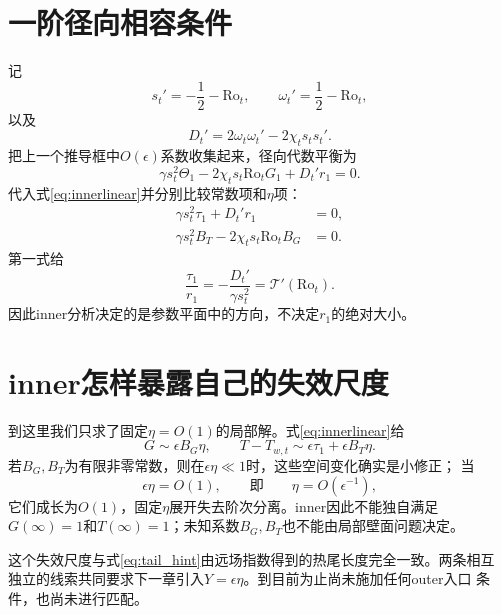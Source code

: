 \documentclass[UTF8,zihao=-4,openany]{ctexbook}
\newcommand{\eps}{\epsilon}
\newcommand{\Ro}{\mathrm{Ro}}
\newcommand{\Tcurve}{\mathcal T}
\begin{document}
\section{一阶径向相容条件}

记
\begin{equation}
 s_t'=-\frac12-\Ro_t,\qquad \omega_t'=\frac12-\Ro_t,
\end{equation}
以及
\begin{equation}
 D_t'=2\omega_t\omega_t'-2\chi_t s_t s_t'.
\end{equation}
把上一个推导框中$O(\eps)$系数收集起来，径向代数平衡为
\begin{equation}\label{eq:innercompat1}
 \gamma s_t^2\Theta_1-2\chi_t s_t\Ro_tG_1+D_t'r_1=0.
\end{equation}
代入式\eqref{eq:innerlinear}并分别比较常数项和$\eta$项：
\begin{subequations}
\begin{align}
 \gamma s_t^2\tau_1+D_t'r_1&=0,\\
 \gamma s_t^2B_T-2\chi_t s_t\Ro_tB_G&=0.
\end{align}
\end{subequations}
第一式给
\begin{equation}\label{eq:slopeinner}
 \boxed{\frac{\tau_1}{r_1}=-\frac{D_t'}{\gamma s_t^2}=\Tcurve'(\Ro_t).}
\end{equation}
因此inner分析决定的是参数平面中的方向，不决定$r_1$的绝对大小。

\section{inner怎样暴露自己的失效尺度}

到这里我们只求了固定$\eta=O(1)$的局部解。式\eqref{eq:innerlinear}给
\begin{equation}
 G\sim\eps B_G\eta,
 \qquad
 T-T_{w,t}\sim\eps\tau_1+\eps B_T\eta.
\end{equation}
若$B_G,B_T$为有限非零常数，则在$\eps\eta\ll1$时，这些空间变化确实是小修正；
当
\begin{equation}\label{eq:inner_breakdown}
 \eps\eta=O(1),\qquad\text{即}\qquad \eta=O(\eps^{-1}),
\end{equation}
它们成长为$O(1)$，固定$\eta$展开失去阶次分离。inner因此不能独自满足
$G(\infty)=1$和$T(\infty)=1$；未知系数$B_G,B_T$也不能由局部壁面问题决定。

这个失效尺度与式\eqref{eq:tail_hint}由远场指数得到的热尾长度完全一致。两条相互
独立的线索共同要求下一章引入$Y=\eps\eta$。到目前为止尚未施加任何outer入口
条件，也尚未进行匹配。
\end{document}
